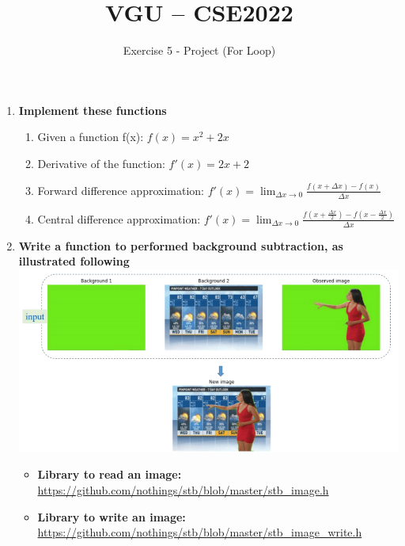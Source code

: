\documentclass[11pt]{article}
\title{\LARGE VGU – CSE2022}
\author{\Huge Exercise 5 - Project (For Loop)}
\begin{document}
\maketitle


\begin{enumerate}

\item
\textbf{Implement these functions}

\begin{enumerate}
    \item Given a function f(x): $f(x) = x^{2} + 2x$ 
    \item Derivative of the function: $f'(x) = 2x + 2$
    \item Forward difference approximation: $f'(x) = \lim_{\Delta x\rightarrow 0}\frac{f(x+\Delta x) - f(x)}{\Delta x}$
    \item Central difference approximation: $f'(x) = \lim_{\Delta x\rightarrow 0}\frac{f(x+\frac{\Delta x}{2}) - f(x - \frac{\Delta x}{2})}{\Delta x}$
\end{enumerate}

\item 
\textbf{Write a function to performed background subtraction, as illustrated following}\\
\includegraphics[width=\textwidth]{5-1}
    \begin{itemize}
        \item \textbf{Library to read an image:}\\
        \url{https://github.com/nothings/stb/blob/master/stb_image.h}
        \item \textbf{Library to write an image:}\\
        \url{https://github.com/nothings/stb/blob/master/stb_image_write.h} 
    \end{itemize}
\end{enumerate}
\end{document}
